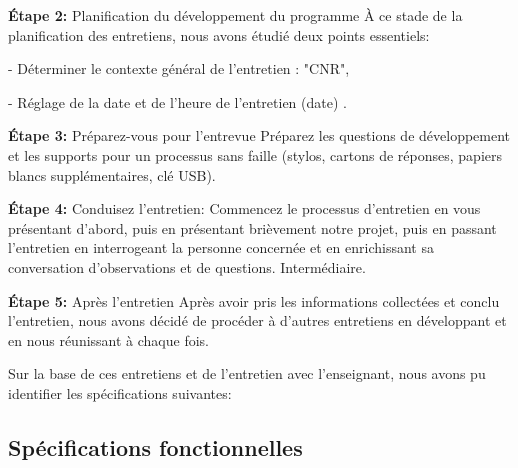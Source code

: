 \textbf{Étape 2:}
Planification du développement du programme À ce stade de la planification des entretiens, nous avons étudié deux points essentiels:

- Déterminer le contexte général de l'entretien : "CNR",

- Réglage de la date et de l'heure de l'entretien (date) .

\textbf{ Étape 3:} Préparez-vous pour l’entrevue Préparez les questions de développement et les supports pour un processus sans faille (stylos, cartons de réponses, papiers blancs supplémentaires, clé USB).


\textbf{ Étape 4:} Conduisez l’entretien: Commencez le processus d’entretien en vous présentant d’abord, puis en présentant brièvement notre projet, puis en passant l’entretien en interrogeant la personne concernée et en enrichissant sa conversation d’observations et de questions. Intermédiaire.
 
\textbf{ Étape 5:} Après l'entretien Après avoir pris les informations collectées et conclu l'entretien, nous avons décidé de procéder à d'autres entretiens en développant et en nous réunissant à chaque fois.
 
 
 Sur la base de ces entretiens et de l'entretien avec l'enseignant, nous avons pu identifier les spécifications suivantes:
 
 \subsection{Spécifications fonctionnelles }
 
